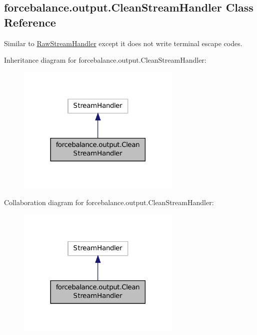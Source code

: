 \hypertarget{classforcebalance_1_1output_1_1CleanStreamHandler}{\subsection{forcebalance.\-output.\-Clean\-Stream\-Handler Class Reference}
\label{classforcebalance_1_1output_1_1CleanStreamHandler}
}


Similar to \hyperlink{classforcebalance_1_1output_1_1RawStreamHandler}{Raw\-Stream\-Handler} except it does not write terminal escape codes.  




Inheritance diagram for forcebalance.\-output.\-Clean\-Stream\-Handler\-:\nopagebreak
\begin{figure}[H]
\begin{center}
\leavevmode
\includegraphics[width=222pt]{classforcebalance_1_1output_1_1CleanStreamHandler__inherit__graph}
\end{center}
\end{figure}


Collaboration diagram for forcebalance.\-output.\-Clean\-Stream\-Handler\-:\nopagebreak
\begin{figure}[H]
\begin{center}
\leavevmode
\includegraphics[width=222pt]{classforcebalance_1_1output_1_1CleanStreamHandler__coll__graph}
\end{center}
\end{figure}

